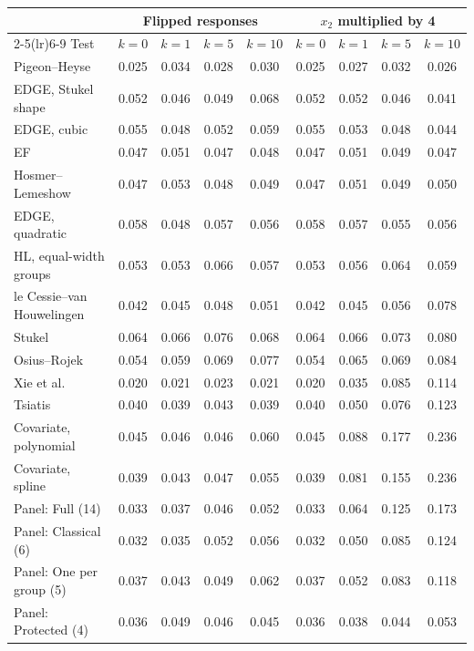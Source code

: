 \begin{tabular}{lcccccccc}
\toprule
 & \multicolumn{4}{c}{Flipped responses} & \multicolumn{4}{c}{$x_2$ multiplied by 4} \\
\cmidrule(lr){2-5}\cmidrule(lr){6-9}
Test & $k=0$ & $k=1$ & $k=5$ & $k=10$ & $k=0$ & $k=1$ & $k=5$ & $k=10$ \\
\midrule
Pigeon--Heyse & 0.025 & 0.034 & 0.028 & 0.030 & 0.025 & 0.027 & 0.032 & 0.026 \\
EDGE, Stukel shape & 0.052 & 0.046 & 0.049 & 0.068 & 0.052 & 0.052 & 0.046 & 0.041 \\
EDGE, cubic & 0.055 & 0.048 & 0.052 & 0.059 & 0.055 & 0.053 & 0.048 & 0.044 \\
EF & 0.047 & 0.051 & 0.047 & 0.048 & 0.047 & 0.051 & 0.049 & 0.047 \\
Hosmer--Lemeshow & 0.047 & 0.053 & 0.048 & 0.049 & 0.047 & 0.051 & 0.049 & 0.050 \\
EDGE, quadratic & 0.058 & 0.048 & 0.057 & 0.056 & 0.058 & 0.057 & 0.055 & 0.056 \\
HL, equal-width groups & 0.053 & 0.053 & 0.066 & 0.057 & 0.053 & 0.056 & 0.064 & 0.059 \\
le Cessie--van Houwelingen & 0.042 & 0.045 & 0.048 & 0.051 & 0.042 & 0.045 & 0.056 & 0.078 \\
Stukel & 0.064 & 0.066 & 0.076 & 0.068 & 0.064 & 0.066 & 0.073 & 0.080 \\
Osius--Rojek & 0.054 & 0.059 & 0.069 & 0.077 & 0.054 & 0.065 & 0.069 & 0.084 \\
Xie et al. & 0.020 & 0.021 & 0.023 & 0.021 & 0.020 & 0.035 & 0.085 & 0.114 \\
Tsiatis & 0.040 & 0.039 & 0.043 & 0.039 & 0.040 & 0.050 & 0.076 & 0.123 \\
Covariate, polynomial & 0.045 & 0.046 & 0.046 & 0.060 & 0.045 & 0.088 & 0.177 & 0.236 \\
Covariate, spline & 0.039 & 0.043 & 0.047 & 0.055 & 0.039 & 0.081 & 0.155 & 0.236 \\
\midrule
Panel: Full (14) & 0.033 & 0.037 & 0.046 & 0.052 & 0.033 & 0.064 & 0.125 & 0.173 \\
Panel: Classical (6) & 0.032 & 0.035 & 0.052 & 0.056 & 0.032 & 0.050 & 0.085 & 0.124 \\
Panel: One per group (5) & 0.037 & 0.043 & 0.049 & 0.062 & 0.037 & 0.052 & 0.083 & 0.118 \\
Panel: Protected (4) & 0.036 & 0.049 & 0.046 & 0.045 & 0.036 & 0.038 & 0.044 & 0.053 \\
\bottomrule
\end{tabular}